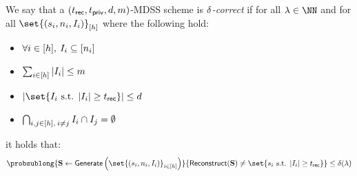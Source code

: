 \begin{definition}[MD-Correctness]
	\label{def:md-correctness}
	We say that a $(t_{\mathsf{rec}}, t_{\mathsf{priv}}, d, m)$-MDSS scheme is $\delta$\emph{-correct} if for all $\secpar \in \NN$ and for all $\set{(\mdssSecret_i, \mdssNumShares_i, \indexSet_i)}_{[\mdssNumShareSets]}$ where the following hold:
	\begin{itemize}
		\item $\forall i \in [h],\: I_i \subseteq [n_i]$

		\item $\sum_{i \in [h]} |I_i| \leq m$
		\item $|\set{\indexSet_i \text{ s.t. } |\indexSet_i| \geq \mdssRecThr}| \leq \mdssMaxDealers$

		\item $\bigcap_{i, j \in [h],\: i \neq j} I_i \cap I_j = \emptyset$
	\end{itemize}
	it holds that:
	\begin{equation*}
		\probsublong{
			\mdssShareList \gets  \mdssGenerate\left(\set{(\mdssSecret_i, \mdssNumShares_i, \indexSet_i)}_{i \in [\mdssNumShareSets]}\right)
		}{
			\mdssReconstructAlg(\mdssShareList) \neq \set{\mdssSecret_i \text{ s.t. } |\indexSet_i| \geq \mdssRecThr}
		} \leq \mdssCVar(\secpar)
	\end{equation*}
\end{definition}
